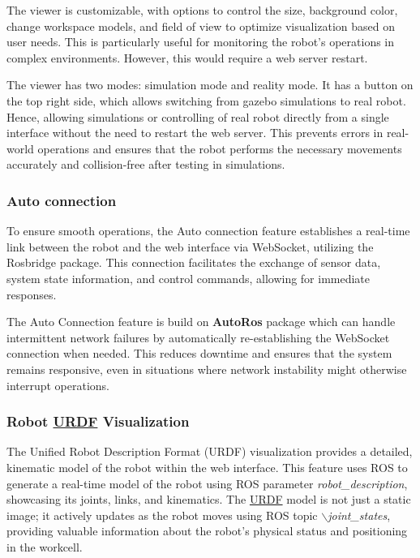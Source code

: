 The viewer is customizable, with options to control the size, background color, change workspace models, and field of view to optimize visualization based on user needs. This is particularly useful for monitoring the robot's operations in complex environments. However, this would require a web server restart.

The viewer has two modes: simulation mode and reality mode. It has a button on the top right side, which allows switching from gazebo simulations to real robot. Hence, allowing simulations or controlling of real robot directly from a single interface without the need to restart the web server. This prevents errors in real-world operations and ensures that the robot performs the necessary movements accurately and collision-free after testing in simulations.


\subsubsection{Auto connection}
\label{subsubsec:web-ui-auto-connection}
To ensure smooth operations, the Auto connection feature establishes a real-time link between the robot and the web interface via WebSocket, utilizing the Rosbridge package. This connection facilitates the exchange of sensor data, system state information, and control commands, allowing for immediate responses.

The Auto Connection feature is build on \textbf{AutoRos} package which can handle intermittent network failures by automatically re-establishing the WebSocket connection when needed. This reduces downtime and ensures that the system remains responsive, even in situations where network instability might otherwise interrupt operations.

\subsubsection{Robot \hyperref[acro:URDF]{URDF} Visualization}
\label{subsubsec:web-ui-urdf-visualization}
The Unified Robot Description Format (URDF) visualization provides a detailed, kinematic model of the robot within the web interface. This feature uses ROS to generate a real-time model of the robot using ROS parameter \textit{robot\_description}, showcasing its joints, links, and kinematics. The \hyperref[acro:URDF]{URDF} model is not just a static image; it actively updates as the robot moves using ROS topic \textit{$\backslash$joint\_states}, providing valuable information about the robot's physical status and positioning in the workcell.

